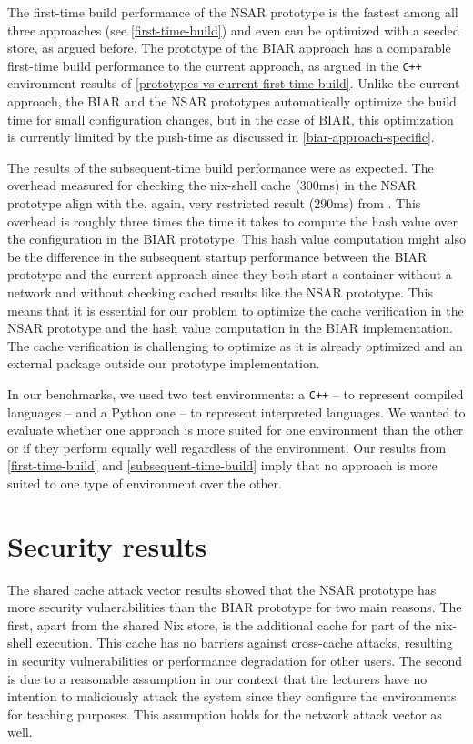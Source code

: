 The first-time build performance of the NSAR prototype is the fastest among all three approaches (see \ref{first-time-build}) and even can be optimized with a seeded store, as argued before. The prototype of the BIAR approach has a comparable first-time build performance to the current approach, as argued in the \verb|C++| environment results of \ref{prototypes-vs-current-first-time-build}. Unlike the current approach, the BIAR and the NSAR prototypes automatically optimize the build time for small configuration changes, but in the case of BIAR, this optimization is currently limited by the push-time as discussed in \ref{biar-approach-specific}.

The results of the subsequent-time build performance were as expected. The overhead measured for checking the nix-shell cache (300ms) in the NSAR prototype align with the, again, very restricted result (290ms) from \cite{CachedNixShell}. This overhead is roughly three times the time it takes to compute the hash value over the configuration in the BIAR prototype. This hash value computation might also be the difference in the subsequent startup performance between the BIAR prototype and the current approach since they both start a container without a network and without checking cached results like the NSAR prototype. This means that it is essential for our problem to optimize the cache verification in the NSAR prototype and the hash value computation in the BIAR implementation. The cache verification is challenging to optimize as it is already optimized and an external package outside our prototype implementation. 

In our benchmarks, we used two test environments: a \verb|C++| -- to represent compiled languages -- and a Python one -- to represent interpreted languages. We wanted to evaluate whether one approach is more suited for one environment than the other or if they perform equally well regardless of the environment. Our results from \ref{first-time-build} and \ref{subsequent-time-build} imply that no approach is more suited to one type of environment over the other. 

\section{Security results}\label{discussion:security}
The shared cache attack vector results showed that the NSAR prototype has more security vulnerabilities than the BIAR prototype for two main reasons. The first, apart from the shared Nix store, is the additional cache for part of the nix-shell execution. This cache has no barriers against cross-cache attacks, resulting in security vulnerabilities or performance degradation for other users. The second is due to a reasonable assumption in our context that the lecturers have no intention to maliciously attack the system since they configure the environments for teaching purposes. This assumption holds for the network attack vector as well. 


